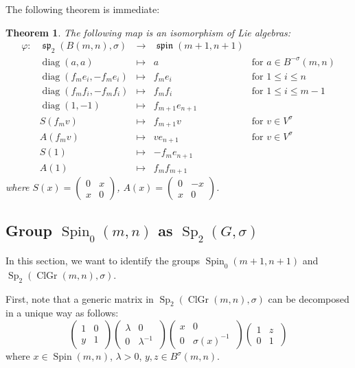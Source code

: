 \documentclass[a4paper,oneside,11pt]{amsart}
\DeclareMathOperator{\diag}{diag}
\DeclareMathOperator{\Sp}{Sp}
\DeclareMathOperator{\spin}{\mathfrak{spin}}
\DeclareMathOperator{\spp}{\mathfrak{sp}}
\DeclareMathOperator{\ClGr}{ClGr}
\DeclareMathOperator{\Spin}{Spin}
\theoremstyle{plain}
\newtheorem{teo}{Theorem}[section]
\theoremstyle{definition}
\theoremstyle{remark}
\begin{document}
The following theorem is immediate:
\begin{teo}
The following map is an isomorphism of Lie algebras:
$$\begin{array}{rrcll}
\varphi\colon & \spp_2(B(m,n),\sigma) & \to & \spin(m+1,n+1) \\
& \diag(a,a) & \mapsto & a & \text{for }a\in B^{-\sigma}(m,n)\\
& \diag(f_me_i,-f_me_i) & \mapsto & f_me_i & \text{for }1\leq i\leq n\\
& \diag(f_mf_i,-f_mf_i) & \mapsto & f_mf_i & \text{for }1\leq i\leq m-1\\
& \diag(1,-1) & \mapsto & f_{m+1}e_{n+1} \\
& S(f_mv) & \mapsto & f_{m+1}v & \text{for }v\in V^\sigma\\
& A(f_mv) & \mapsto & ve_{n+1} & \text{for }v\in V^\sigma\\
& S(1) & \mapsto & -f_me_{n+1}\\
& A(1) & \mapsto & f_mf_{m+1}
\end{array}$$
where $S(x)=\begin{pmatrix} 0 & x \\ x & 0 \end{pmatrix}$, $A(x)=\begin{pmatrix} 0 & -x \\ x & 0 \end{pmatrix}$.
\end{teo}






\subsection{Group \texorpdfstring{$\Spin_0(m,n)$}{Spin0(m,n)} as \texorpdfstring{$\Sp_2(G,\sigma)$}{Sp2(G,sigma)}}

In this section, we want to identify the groups $\Spin_0(m+1,n+1)$ and $\Sp_2(\ClGr(m,n),\sigma)$.

First, note that a generic matrix in $\Sp_2(\ClGr(m,n),\sigma)$ can be decomposed in a unique way as follows:
\begin{equation}\label{eq:sp2-clifford-decomposition}
\begin{pmatrix}
1 & 0 \\
y & 1\
\end{pmatrix}
\begin{pmatrix}
\lambda & 0 \\
0 & \lambda^{-1}\
\end{pmatrix}
\begin{pmatrix}
x & 0 \\
0 & \sigma(x)^{-1}\
\end{pmatrix}
\begin{pmatrix}
1 & z \\
0 & 1\
\end{pmatrix}    
\end{equation}
where $x\in\Spin(m,n)$, $\lambda>0$, $y,z\in B^{\sigma}(m,n)$.
\end{document}
